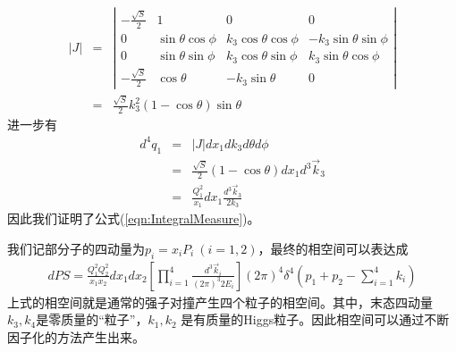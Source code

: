 \begin{eqnarray}
|J| &=& \left|\begin{array}{cccc}
-\frac{\sqrt{S}}{2} & 1 & 0 & 0 \\
0 & \sin\theta\cos\phi  &  k_3\cos\theta\cos\phi   &  -k_3\sin\theta\sin\phi \\
0 & \sin\theta\sin\phi  &  k_3\cos\theta\sin\phi   &  k_3\sin\theta\cos\phi  \\
-\frac{\sqrt{S}}{2} & \cos\theta  & -k_3\sin\theta &   0
\end{array} \right|
\nonumber \\
&=&  \frac{\sqrt{S}}{2} k^2_3(1-\cos\theta)\sin\theta
\end{eqnarray}
进一步有
\begin{eqnarray}
d^4q_1 &=& |J| dx_1 dk_3 d\theta d\phi  \nonumber \\
&=& \frac{\sqrt{S}}{2} (1-\cos\theta)dx_1 d^3 \vec{k}_3 \nonumber \\
&=& \frac{Q^2_1}{x_1} dx_1 \frac{d^3\vec{k}_3}{2k_3}
\end{eqnarray}
因此我们证明了公式(\ref{eqn:IntegralMeasure})。

我们记部分子的四动量为$p_i = x_i P_i~(i=1,2)$，最终的相空间可以表达成
\begin{eqnarray}
d PS =
\frac{Q_1^2 Q_2^2}{x_1 x_2} d x_1 d x_2
\left[
\prod_{i=1}^4
\frac{d^3 \vec{k}_i}{\left( 2 \pi \right)^3 2 E_i}
\right]
\left( 2 \pi \right)^4 \delta^4 \left( p_1 + p_2 - \sum_{i=1}^4 k_i \right)
\end{eqnarray}
上式的相空间就是通常的强子对撞产生四个粒子的相空间。其中，末态四动量$k_3,k_4$是零质量的“粒子”，$k_1,k_2$
是有质量的Higgs粒子。因此相空间可以通过不断因子化的方法产生出来。
